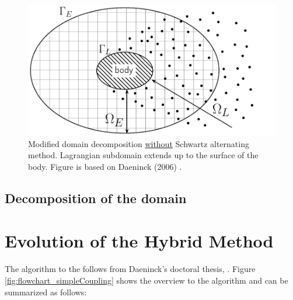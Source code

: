 		\begin{figure}[!t]
			\centering
			\includegraphics[width=0.6\linewidth]{figures/introduction/domainDecomposition_daenick_type2.pdf}
			\caption{Modified domain decomposition \underline{without} Schwartz alternating method. Lagrangian subdomain extends up to the surface of the body. Figure is based on Daeninck (2006) \cite{Daeninck2006}.}
			\label{fig:domainDecomposition_daenick}
		\end{figure}

		\subsection{Decomposition of the domain}
	

	\section{Evolution of the Hybrid Method}
	
	The algorithm to the  follows from Daeninck's doctoral thesis, \cite{Daeninck2006}. Figure \ref{fig:flowchart_simpleCoupling} shows the overview to the algorithm and can be summarized as follows:

